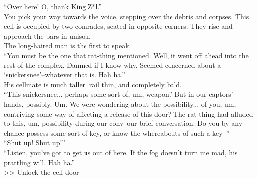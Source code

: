 “Over here! O, thank King Z*l.”\\

You pick your way towards the voice, stepping over the debris and corpses. This cell is occupied by two comrades, seated in opposite corners. They rise and approach the bars in unison.\\

The long-haired man is the first to speak.\\
“You must be the one that rat-thing mentioned. Well, it went off ahead into the rest of the complex. Damned if I know why. Seemed concerned about a ‘snickersnee’--whatever that is. Hah ha.”\\

His cellmate is much taller, rail thin, and completely bald.\\
“This snickersnee... perhaps some sort of, um, weapon? But in our captors’ hands, possibly. Um. We were wondering about the possibility... of you, um, contriving some way of affecting a release of this door? The rat-thing had alluded to this, um, possibility during our conv--our brief conversation. Do you by any chance possess some sort of key, or know the whereabouts of such a key--”\\

“Shut up! Shut up!”\\

“Listen, you’ve got to get us out of here. If the fog doesn’t turn me mad, his prattling will. Hah ha.”\\

>> Unlock the cell door -- 